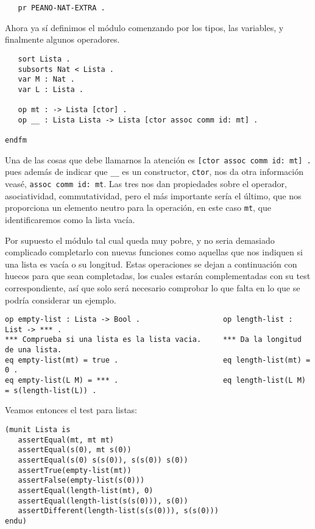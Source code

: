 {\codesize
\begin{verbatim}
   pr PEANO-NAT-EXTRA .
\end{verbatim}
}

Ahora ya sí definimos el módulo comenzando por los tipos, las variables, y finalmente algunos operadores. \par

{\codesize
\begin{verbatim}
   sort Lista .
   subsorts Nat < Lista .
   var M : Nat .
   var L : Lista .	

   op mt : -> Lista [ctor] .
   op __ : Lista Lista -> Lista [ctor assoc comm id: mt] .

endfm
\end{verbatim}
}

Una de las cosas que debe llamarnos la atención es \verb"[ctor assoc comm id: mt] ." pues además de indicar que \verb"__" es un constructor, \texttt{ctor}, nos da otra información veasé, \texttt{assoc comm id: mt}. Las tres nos dan propiedades sobre el operador, asociatividad, commutatividad, pero el más importante sería el último, que nos proporciona un elemento neutro para la operación, en este caso \texttt{mt}, que identificaremos como la lista vacía. \par

Por supuesto el módulo tal cual queda muy pobre, y no seria demasiado complicado completarlo con nuevas funciones como aquellas que nos indiquen si una lista es vacía o su longitud. Estas operaciones se dejan a continuación con huecos para que sean completadas, los cuales estarán complementadas con su test correspondiente, así que solo será necesario comprobar lo que falta en lo que se podría considerar un ejemplo. \par

{\codesize
\begin{verbatim}
op empty-list : Lista -> Bool .                   op length-list : List -> *** .
*** Comprueba si una lista es la lista vacia.     *** Da la longitud de una lista.
eq empty-list(mt) = true .                        eq length-list(mt) = 0 .
eq empty-list(L M) = *** .                        eq length-list(L M) = s(length-list(L)) .
\end{verbatim}
}

Veamos entonces el test para listas: \par

\begin{verbatim}
(munit Lista is
   assertEqual(mt, mt mt)
   assertEqual(s(0), mt s(0))
   assertEqual(s(0) s(s(0)), s(s(0)) s(0))
   assertTrue(empty-list(mt))
   assertFalse(empty-list(s(0)))
   assertEqual(length-list(mt), 0)
   assertEqual(length-list(s(s(0))), s(0))
   assertDifferent(length-list(s(s(0))), s(s(0)))
endu)
\end{verbatim}

